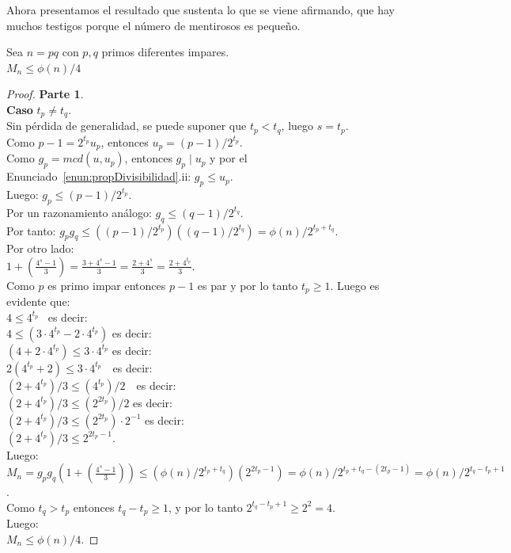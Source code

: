 Ahora presentamos el resultado que sustenta lo que se viene afirmando, que hay muchos testigos porque el número de mentirosos es pequeño.

\begin{enunciado} \label{enun:cotamentirosos}\leavevmode\par 
Sea $n=pq$ con $p,q$ primos diferentes impares. \\
$M_n \leq \phi(n)/4$ 
\end{enunciado}

\begin{proof} \textbf{Parte 1}. \\
\textbf{Caso} $t_p \neq t_q$. \\
Sin pérdida de generalidad, se puede suponer que $t_p < t_q$, luego $s=t_p$. \\
Como $p-1 = 2^{t_p}u_p$, entonces $u_p = (p-1)/2^{t_p}$. \\
Como $g_p = mcd(u,u_p)$, entonces $g_p \mid u_p$ y por el Enunciado~\ref{enun:propDivisibilidad}.ii: $g_p \leq u_p$. \\
Luego: $g_p \leq (p-1)/2^{t_p}$. \\
Por un razonamiento análogo: $g_q \leq (q-1)/2^{t_q}$. \\
Por tanto: $g_pg_q \leq ((p-1)/2^{t_p})((q-1)/2^{t_q}) = \phi(n) / 2^{t_p+t_q}$. \\
Por otro lado: \\
$1+(\frac{4^s - 1}{3}) = \frac{3+4^s - 1}{3} = \frac{2+4^s}{3} = \frac{2+4^{t_p}}{3}$. \\
Como $p$ es primo impar entonces $p-1$ es par y por lo tanto $t_p \geq 1$. Luego es evidente que: \\
$4 \leq 4^{t_p}$ \qquad\qquad\qquad\qquad\, es decir: \\
$4 \leq (3\cdot4^{t_p} - 2\cdot4^{t_p})$ \quad\qquad es decir: \\
$(4 + 2\cdot4^{t_p}) \leq 3\cdot4^{t_p}$ \quad\qquad es decir: \\
$2(4^{t_p} + 2) \leq 3\cdot4^{t_p}$ \qquad\quad\,\, es decir: \\
$(2+4^{t_p})/3 \leq (4^{t_p})/2$ \quad\quad\,\, es decir: \\
$(2+4^{t_p})/3 \leq (2^{2t_p})/2$ \qquad es decir: \\
$(2+4^{t_p})/3 \leq (2^{2t_p}) \cdot 2^{-1}$ \quad es decir: \\
$(2+4^{t_p})/3 \leq 2^{2t_p - 1}$. \\
Luego: \\
$M_n = g_pg_q(1+(\frac{4^s - 1}{3})) \leq (\phi(n) / 2^{t_p+t_q})(2^{2t_p - 1}) = \phi(n) / 2^{t_p+t_q-(2t_p - 1)} = \phi(n) / 2^{t_q-t_p+1}$. \\
Como $t_q > t_p$ entonces $t_q - t_p \geq 1$, y por lo tanto $2^{t_q - t_p + 1} \geq 2^{2} = 4$. \\
Luego: \\
$M_n \leq \phi(n)/4$. 
\end{proof}

